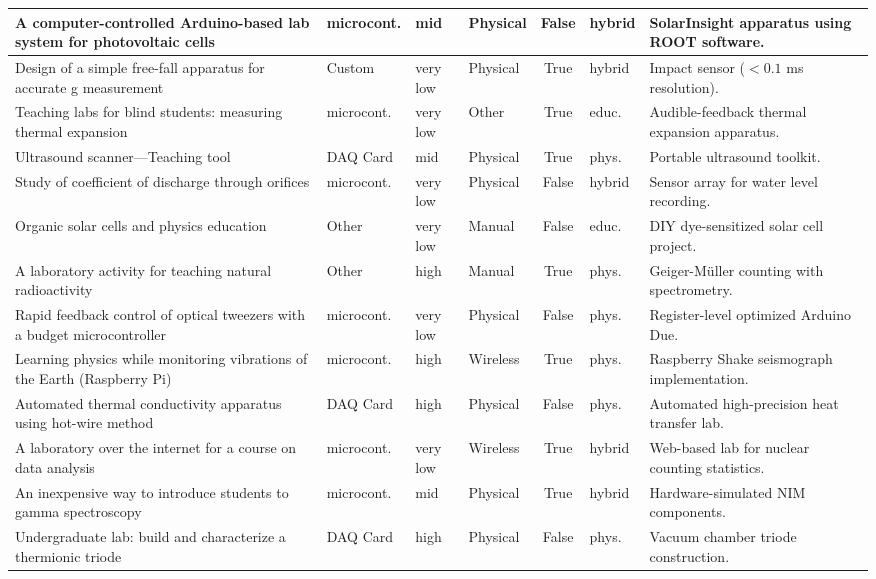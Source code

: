 \documentclass[12pt]{article}
\begin{document}
\begin{xltabular}{\textwidth}{|X|l|l|l|c|l|X|}
    A computer-controlled Arduino-based lab system for photovoltaic cells & microcont. & mid & Physical & False & hybrid & SolarInsight apparatus using ROOT software. \\ \hline
    Design of a simple free-fall apparatus for accurate g measurement & Custom & very low & Physical & True & hybrid & Impact sensor ($<0.1$ ms resolution). \\ \hline
    Teaching labs for blind students: measuring thermal expansion & microcont. & very low & Other & True & educ. & Audible-feedback thermal expansion apparatus. \\ \hline
    Ultrasound scanner—Teaching tool & DAQ Card & mid & Physical & True & phys. & Portable ultrasound toolkit. \\ \hline
    Study of coefficient of discharge through orifices & microcont. & very low & Physical & False & hybrid & Sensor array for water level recording. \\ \hline
    Organic solar cells and physics education & Other & very low & Manual & False & educ. & DIY dye-sensitized solar cell project. \\ \hline
    A laboratory activity for teaching natural radioactivity & Other & high & Manual & True & phys. & Geiger-Müller counting with spectrometry. \\ \hline
    Rapid feedback control of optical tweezers with a budget microcontroller & microcont. & very low & Physical & False & phys. & Register-level optimized Arduino Due. \\ \hline
    Learning physics while monitoring vibrations of the Earth (Raspberry Pi) & microcont. & high & Wireless & True & phys. & Raspberry Shake seismograph implementation. \\ \hline
    Automated thermal conductivity apparatus using hot-wire method & DAQ Card & high & Physical & False & phys. & Automated high-precision heat transfer lab. \\ \hline
    A laboratory over the internet for a course on data analysis & microcont. & very low & Wireless & True & hybrid & Web-based lab for nuclear counting statistics. \\ \hline
    An inexpensive way to introduce students to gamma spectroscopy & microcont. & mid & Physical & True & hybrid & Hardware-simulated NIM components. \\ \hline
    Undergraduate lab: build and characterize a thermionic triode & DAQ Card & high & Physical & False & phys. & Vacuum chamber triode construction. \\ \hline

\end{xltabular}
\end{document}
